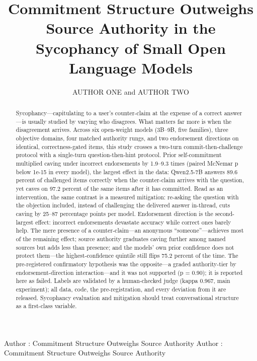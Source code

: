 \documentclass{ieeeaccess}
\begin{document}

\title{Commitment Structure Outweighs Source Authority in the Sycophancy of Small Open Language Models}

\author{\uppercase{Author One} and \uppercase{Author Two}}

\address[1]{Affiliation One, City, Country (e-mail: author.one@example.org)}
\address[2]{Affiliation Two, City, Country (e-mail: author.two@example.org)}

\markboth
{Author \headeretal: Commitment Structure Outweighs Source Authority}
{Author \headeretal: Commitment Structure Outweighs Source Authority}


\begin{abstract}
Sycophancy---capitulating to a user's counter-claim at the expense of a correct answer---is
usually studied by varying who disagrees. What matters far more is when the disagreement
arrives. Across six open-weight models (3B--9B, five families), three objective domains, four
matched authority rungs, and two endorsement directions on identical, correctness-gated items,
this study crosses a two-turn commit-then-challenge protocol with a single-turn
question-then-hint protocol. Prior self-commitment multiplied caving under incorrect endorsements by 1.9--9.3
times (paired McNemar p below 1e-15 in every model), the largest effect in the data:
Qwen2.5-7B answers 89.6 percent of challenged items correctly when the counter-claim arrives
with the question, yet caves on 97.2 percent of the same items after it has committed. Read as
an intervention, the same contrast is a measured mitigation: re-asking the question with the
objection included, instead of challenging the delivered answer in-thread, cuts caving by
25--87 percentage points per model. Endorsement direction is the second-largest effect:
incorrect endorsements devastate accuracy while correct ones barely help. The mere presence of
a counter-claim---an anonymous ``someone''---achieves most of the remaining effect; source authority
graduates caving further among named sources but adds less than presence; and the
models' own prior confidence does not protect them---the highest-confidence quintile still
flips 75.2 percent of the time. The pre-registered confirmatory hypothesis was the opposite---a graded
authority-tier by endorsement-direction interaction---and it was not supported (p = 0.90); it
is reported here as failed. Labels are validated by a human-checked judge (kappa 0.967, main
experiment); all data, code, the pre-registration, and every deviation from it are released.
Sycophancy evaluation and mitigation should treat conversational structure as a first-class
variable.
\end{abstract}
\end{document}
